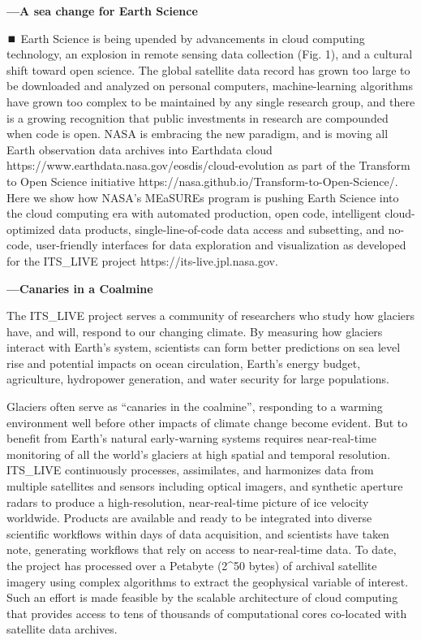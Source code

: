 \documentclass[
  super,
  preprint,
  3p,
  twocolumn]{elsarticle}
\begin{document}
\textbf{---A sea change for Earth Science}

⏹️ Earth Science is being upended by advancements in cloud computing
technology, an explosion in remote sensing data collection (Fig. 1), and
a cultural shift toward open science. The global satellite data record
has grown too large to be downloaded and analyzed on personal computers,
machine-learning algorithms have grown too complex to be maintained by
any single research group, and there is a growing recognition that
public investments in research are compounded when code is open. NASA is
embracing the new paradigm, and is moving all Earth observation data
archives into Earthdata cloud
https://www.earthdata.nasa.gov/eosdis/cloud-evolution as part of the
Transform to Open Science initiative
https://nasa.github.io/Transform-to-Open-Science/. Here we show how
NASA's MEaSUREs program is pushing Earth Science into the cloud
computing era with automated production, open code, intelligent
cloud-optimized data products, single-line-of-code data access and
subsetting, and no-code, user-friendly interfaces for data exploration
and visualization as developed for the ITS\_LIVE project
https://its-live.jpl.nasa.gov.

\textbf{---Canaries in a Coalmine}

The ITS\_LIVE project serves a community of researchers who study how
glaciers have, and will, respond to our changing climate. By measuring
how glaciers interact with Earth's system, scientists can form better
predictions on sea level rise and potential impacts on ocean
circulation, Earth's energy budget, agriculture, hydropower generation,
and water security for large populations.

Glaciers often serve as ``canaries in the coalmine'', responding to a
warming environment well before other impacts of climate change become
evident. But to benefit from Earth's natural early-warning systems
requires near-real-time monitoring of all the world's glaciers at high
spatial and temporal resolution. ITS\_LIVE continuously processes,
assimilates, and harmonizes data from multiple satellites and sensors
including optical imagers, and synthetic aperture radars to produce a
high-resolution, near-real-time picture of ice velocity worldwide.
Products are available and ready to be integrated into diverse
scientific workflows within days of data acquisition, and scientists
have taken note, generating workflows that rely on access to
near-real-time data. To date, the project has processed over a Petabyte
(2\^{}50 bytes) of archival satellite imagery using complex algorithms
to extract the geophysical variable of interest. Such an effort is made
feasible by the scalable architecture of cloud computing that provides
access to tens of thousands of computational cores co-located with
satellite data archives.
\end{document}
